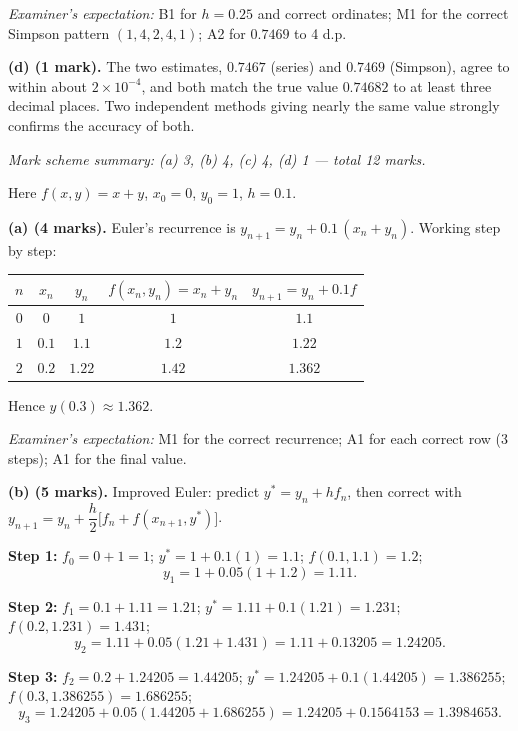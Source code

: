 \documentclass[11pt]{article}
\begin{document}
\begin{corrige}
\emph{Examiner's expectation:} B1 for $h = 0.25$ and correct ordinates; M1 for the correct Simpson pattern $(1,4,2,4,1)$; A2 for $0.7469$ to 4 d.p.

\textbf{(d) (1 mark).} The two estimates, $0.7467$ (series) and $0.7469$ (Simpson), agree to within about $2\times 10^{-4}$, and both match the true value $0.74682$ to at least three decimal places. Two independent methods giving nearly the same value strongly confirms the accuracy of both.

\emph{Mark scheme summary: (a) 3, (b) 4, (c) 4, (d) 1 — total 12 marks.}
\end{corrige}

\begin{corrige}
Here $f(x,y) = x + y$, $x_0 = 0$, $y_0 = 1$, $h = 0.1$.

\textbf{(a) (4 marks).} Euler's recurrence is $y_{n+1} = y_n + 0.1\,(x_n + y_n)$. Working step by step:

\begin{center}
\begin{tabular}{|c|c|c|c|c|}
\hline
\rowcolor{popblueL} $n$ & $x_n$ & $y_n$ & $f(x_n,y_n)=x_n+y_n$ & $y_{n+1} = y_n + 0.1 f$ \\
\hline
$0$ & $0$ & $1$ & $1$ & $1.1$ \\
\hline
$1$ & $0.1$ & $1.1$ & $1.2$ & $1.22$ \\
\hline
$2$ & $0.2$ & $1.22$ & $1.42$ & $1.362$ \\
\hline
\end{tabular}
\end{center}

Hence $y(0.3) \approx 1.362$.

\emph{Examiner's expectation:} M1 for the correct recurrence; A1 for each correct row (3 steps); A1 for the final value.

\textbf{(b) (5 marks).} Improved Euler: predict $y^{*} = y_n + h f_n$, then correct with $y_{n+1} = y_n + \dfrac{h}{2}\big[f_n + f(x_{n+1}, y^{*})\big]$.

\textbf{Step 1:} $f_0 = 0 + 1 = 1$; $y^{*} = 1 + 0.1(1) = 1.1$; $f(0.1, 1.1) = 1.2$;
\[ y_1 = 1 + 0.05(1 + 1.2) = 1.11. \]

\textbf{Step 2:} $f_1 = 0.1 + 1.11 = 1.21$; $y^{*} = 1.11 + 0.1(1.21) = 1.231$; $f(0.2, 1.231) = 1.431$;
\[ y_2 = 1.11 + 0.05(1.21 + 1.431) = 1.11 + 0.13205 = 1.24205. \]

\textbf{Step 3:} $f_2 = 0.2 + 1.24205 = 1.44205$; $y^{*} = 1.24205 + 0.1(1.44205) = 1.386255$; $f(0.3, 1.386255) = 1.686255$;
\[ y_3 = 1.24205 + 0.05(1.44205 + 1.686255) = 1.24205 + 0.1564153 = 1.3984653. \]


\end{corrige}
\end{document}
